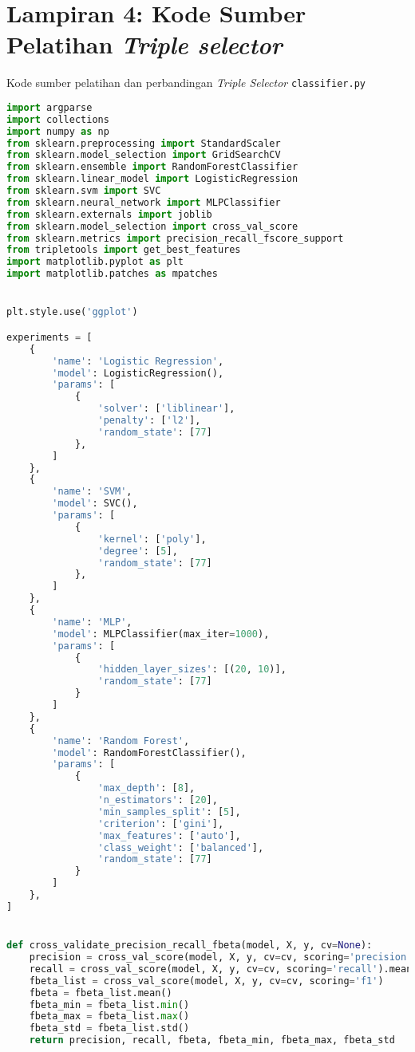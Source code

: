 \chapter*{Lampiran 4: Kode Sumber Pelatihan \textit{Triple selector}}

Kode sumber pelatihan dan perbandingan \textit{Triple Selector} \verb|classifier.py|

\begin{lstlisting}[language=Python]
import argparse
import collections
import numpy as np
from sklearn.preprocessing import StandardScaler
from sklearn.model_selection import GridSearchCV
from sklearn.ensemble import RandomForestClassifier
from sklearn.linear_model import LogisticRegression
from sklearn.svm import SVC
from sklearn.neural_network import MLPClassifier
from sklearn.externals import joblib
from sklearn.model_selection import cross_val_score
from sklearn.metrics import precision_recall_fscore_support
from tripletools import get_best_features
import matplotlib.pyplot as plt
import matplotlib.patches as mpatches


plt.style.use('ggplot')

experiments = [
    {
        'name': 'Logistic Regression',
        'model': LogisticRegression(),
        'params': [
            {
                'solver': ['liblinear'],
                'penalty': ['l2'],
                'random_state': [77]
            },
        ]
    },
    {
        'name': 'SVM',
        'model': SVC(),
        'params': [
            {
                'kernel': ['poly'],
                'degree': [5],
                'random_state': [77]
            },
        ]
    },
    {
        'name': 'MLP',
        'model': MLPClassifier(max_iter=1000),
        'params': [
            {
                'hidden_layer_sizes': [(20, 10)],
                'random_state': [77]
            }
        ]
    },
    {
        'name': 'Random Forest',
        'model': RandomForestClassifier(),
        'params': [
            {
                'max_depth': [8],
                'n_estimators': [20],
                'min_samples_split': [5],
                'criterion': ['gini'],
                'max_features': ['auto'],
                'class_weight': ['balanced'],
                'random_state': [77]
            }
        ]
    },
]


def cross_validate_precision_recall_fbeta(model, X, y, cv=None):
    precision = cross_val_score(model, X, y, cv=cv, scoring='precision').mean()
    recall = cross_val_score(model, X, y, cv=cv, scoring='recall').mean()
    fbeta_list = cross_val_score(model, X, y, cv=cv, scoring='f1')
    fbeta = fbeta_list.mean()
    fbeta_min = fbeta_list.min()
    fbeta_max = fbeta_list.max()
    fbeta_std = fbeta_list.std()
    return precision, recall, fbeta, fbeta_min, fbeta_max, fbeta_std



\end{lstlisting}
